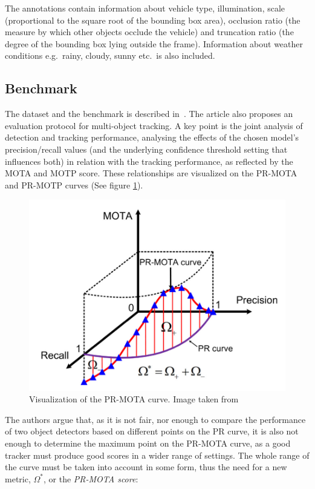 The annotations contain information about vehicle type, illumination, scale (proportional to the square root of the bounding box area), occlusion ratio (the measure by which other objects occlude the vehicle) and truncation ratio (the degree of the bounding box lying outside the frame). Information about weather conditions e.g.~rainy, cloudy, sunny etc.~is also included.

\subsection{Benchmark}

The dataset and the benchmark is described in~\cite{CVIU_UA-DETRAC}. The article also proposes an evaluation protocol for multi-object tracking. A key point is the joint analysis of detection and tracking performance, analysing the effects of the chosen model's precision/recall values (and the underlying confidence threshold setting that influences both) in relation with the tracking performance, as reflected by the MOTA and MOTP score. These relationships are visualized on the PR-MOTA and PR-MOTP curves (See figure \ref{fig:pr-mota}).

\begin{figure}[h]
    \captionsetup{width=\textwidth}
    \includegraphics[width=\textwidth]{figures/pr-mota-curve.png}
    \caption{Visualization of the PR-MOTA curve. Image taken from \cite{CVIU_UA-DETRAC}}
    \label{fig:pr-mota}
\end{figure}

The authors argue that, as it is not fair, nor enough to compare the performance of two object detectors based on different points on the PR curve, it is also not enough to determine the maximum point on the PR-MOTA curve, as a good tracker must produce good scores in a wider range of settings. The whole range of the curve must be taken into account in some form, thus the need for a new metric, $\Omega^{*}$, or the \textit{PR-MOTA score}:

